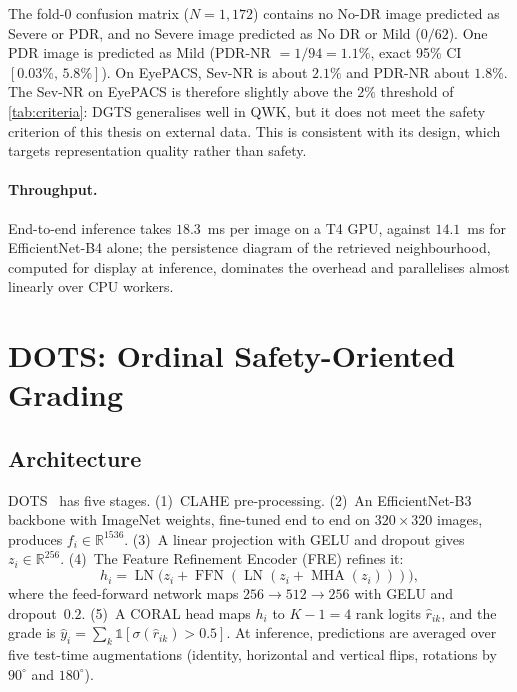 The fold-0 confusion matrix ($N=1{,}172$) contains no No-DR image predicted as Severe or
PDR, and no Severe image predicted as No DR or Mild ($0/62$). One PDR image is predicted as
Mild (PDR-NR $=1/94=1.1\%$, exact 95\% CI $[0.03\%,\,5.8\%]$). On EyePACS, Sev-NR is about
$2.1\%$ and PDR-NR about $1.8\%$. The Sev-NR on EyePACS is therefore slightly above the $2\%$
threshold of \cref{tab:criteria}: DGTS generalises well in QWK, but it does not meet the
safety criterion of this thesis on external data. This is consistent with its design,
which targets representation quality rather than safety.

\paragraph{Throughput.}
End-to-end inference takes $18.3$~ms per image on a T4 GPU, against $14.1$~ms for
EfficientNet-B4 alone; the persistence diagram of the retrieved neighbourhood, computed for
display at inference, dominates the overhead and parallelises almost linearly over CPU
workers.

\section{DOTS: Ordinal Safety-Oriented Grading}
\label{sec:dots}

\subsection{Architecture}
\label{sec:ch4-arch}

DOTS~\cite{belhadj2026dots} has five stages. (1)~CLAHE pre-processing. (2)~An
EfficientNet-B3~\cite{tan2019efficientnet} backbone with ImageNet weights, fine-tuned end to
end on $320\times320$ images, produces $f_i\in\mathbb{R}^{1536}$. (3)~A linear projection
with GELU and dropout gives $z_i\in\mathbb{R}^{256}$. (4)~The Feature Refinement Encoder
(FRE) refines it:
\begin{equation}
h_i=\operatorname{LN}\bigl(z_i+\operatorname{FFN}(\operatorname{LN}(z_i+\operatorname{MHA}(z_i)))\bigr),
\label{eq:fre}
\end{equation}
where the feed-forward network maps $256\to512\to256$ with GELU and dropout~$0.2$.
(5)~A CORAL head maps $h_i$ to $K-1=4$ rank logits $\hat r_{ik}$, and the grade is
$\hat y_i=\sum_{k}\mathbb{1}[\sigma(\hat r_{ik})>0.5]$. At inference, predictions are
averaged over five test-time augmentations (identity, horizontal and vertical flips,
rotations by $90^{\circ}$ and $180^{\circ}$).

